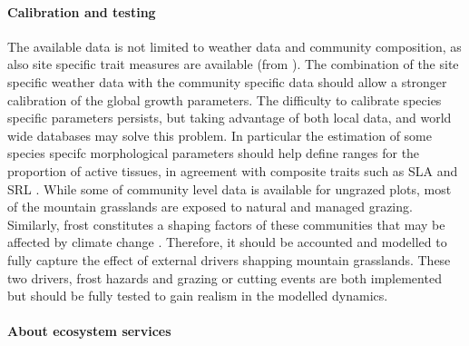\paragraph{Calibration and testing}

The available data is not limited to weather data and community composition, as also site specific trait measures are available (from \citet{deleglise_heterogeneite_2011, chalmandrier_communities_2015}). The combination of the site specific weather data with the community specific data should allow a stronger calibration of the global growth parameters. The difficulty to calibrate species specific parameters persists, but taking advantage of both local data, and world wide databases may solve this problem. In particular the estimation of some species specifc morphological parameters should help define ranges for the proportion of active tissues, in agreement with composite traits such as SLA \parencite{john_anatomical_2017} and SRL \parencite{roumet_root_2016}. While some of community level data is available for ungrazed plots, most of the mountain grasslands are exposed to natural and managed grazing. Similarly, frost constitutes a shaping factors of these communities that may be affected by climate change \parencite{choler_growth_2015}. Therefore, it should be accounted and modelled to fully capture the effect of external drivers shapping mountain grasslands. These two drivers, frost hazards and grazing or cutting events are both implemented but should be fully tested to gain realism in the modelled dynamics.

%
%
%
%
%

\paragraph{About ecosystem services}

